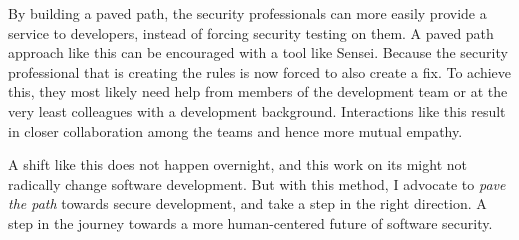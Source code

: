 By building a paved path, the security professionals can more easily provide a service to developers, instead of forcing security testing on them.
A paved path approach like this can be encouraged with a tool like Sensei.
Because the security professional that is creating the rules is now forced to also create a fix.
To achieve this, they most likely need help from members of the development team or at the very least colleagues with a development background.
Interactions like this result in closer collaboration among the teams and hence more mutual empathy.

A shift like this does not happen overnight, and this work on its might not radically change software development.
But with this method, I advocate to \textit{pave the path} towards secure development, and take a step in the right direction.
A step in the journey towards a more human-centered future of software security.